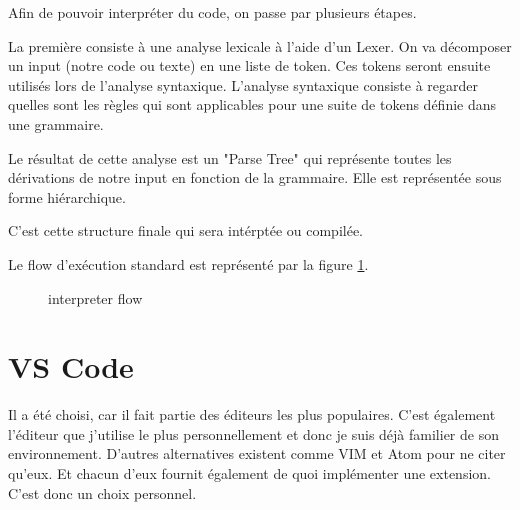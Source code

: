 \documentclass[
    iict, %
    il, %
]{heig-tb}
\begin{document}
Afin de pouvoir interpréter du code, on passe par plusieurs étapes.

La première consiste à une analyse lexicale à l'aide d'un Lexer. On va décomposer un input (notre code ou texte) en une liste de token.
Ces tokens seront ensuite utilisés lors de l'analyse syntaxique. L'analyse syntaxique consiste à regarder quelles sont les règles qui sont applicables pour une suite de tokens définie dans une grammaire.

Le résultat de cette analyse est un "Parse Tree" qui représente toutes les dérivations de notre input en fonction de la grammaire.
Elle est représentée sous forme hiérarchique.

C'est cette structure finale qui sera intérptée ou compilée.

Le flow d'exécution standard est représenté par la figure \ref{interpreter-flow}.

\begin{figure}[!h]
    \begin{center}
    \end{center}
    \caption[interpreter-flow Anatomy]{\label{interpreter-flow} interpreter flow}
\end{figure}


\section{VS Code}

Il a été choisi, car il fait partie des éditeurs les plus populaires. C'est également l'éditeur que j'utilise le plus personnellement et donc je suis déjà familier de son environnement.
D'autres alternatives existent comme VIM et Atom pour ne citer qu'eux. Et chacun d'eux fournit également de quoi implémenter une extension.
C'est donc un choix personnel.
\end{document}
